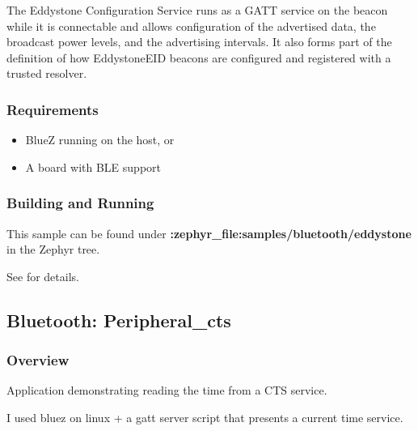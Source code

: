 \documentclass[letterpaper,10pt,english]{sphinxmanual}
\begin{document}
The Eddystone Configuration Service runs as a GATT service on the beacon while
it is connectable and allows configuration of the advertised data, the
broadcast power levels, and the advertising intervals. It also forms part of
the definition of how Eddystone\sphinxhyphen{}EID beacons are configured and registered with
a trusted resolver.


\subsubsection{Requirements}
\label{\detokenize{samples/bluetooth/eddystone/README:requirements}}\begin{itemize}
\item {} 
BlueZ running on the host, or

\item {} 
A board with BLE support

\end{itemize}


\subsubsection{Building and Running}
\label{\detokenize{samples/bluetooth/eddystone/README:building-and-running}}
This sample can be found under {\color{red}\bfseries{}:zephyr\_file:\textasciigrave{}samples/bluetooth/eddystone\textasciigrave{}} in the
Zephyr tree.

See {\hyperref[\detokenize{samples/bluetooth/bluetooth:bluetooth-samples}]{}} for details.


\subsection{Bluetooth: Peripheral\_cts}
\label{\detokenize{samples/bluetooth/peripheral-cts/README:bluetooth-peripheral-cts}}\label{\detokenize{samples/bluetooth/peripheral-cts/README:ble-peripheral-cts}}\label{\detokenize{samples/bluetooth/peripheral-cts/README::doc}}

\subsubsection{Overview}
\label{\detokenize{samples/bluetooth/peripheral-cts/README:overview}}
Application demonstrating reading the time from a CTS service.

I used bluez on linux + a gatt server script that presents a current time service.
\end{document}

